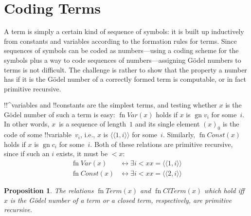 \documentclass[10pt,a4paper]{article}
\theoremstyle{plain}
\newtheorem{prop}[thm]{Proposition}
\theoremstyle{definition}
\theoremstyle{remark}
\newenvironment{explain}{}{}
\newcommand*{\olfileid}[3]{}
\newcommand*{\olsection}[1]{\section*{#1}}
\newcommand*{\ollabel}[1]{\label{#1}}
\providecommand{\Obj}{}
\providecommand{\tuple}[1]{\langle #1 \rangle}
\providecommand{\Gn}{\operatorname{gn}}
\providecommand{\bexists}{\exists}
\providecommand{\defiff}{\mathrel{\leftrightarrow}}
\providecommand{\fn}{\operatorname{fn}}
\begin{document}



\olfileid{inc}{art}{trm}
\olsection{Coding Terms}

\begin{explain}
A term is simply a certain kind of sequence of symbols: it is built up
inductively from constants and variables according to the formation
rules for terms.  Since sequences of symbols can be coded as
numbers---using a coding scheme for the symbols plus a way to code
sequences of numbers---assigning G\"odel numbers to terms is not
difficult.  The challenge is rather to show that the property a number
has if it is the G\"odel number of a correctly formed term is
computable, or in fact primitive recursive.
\end{explain}

!!^{variable}s and !!{constant}s are the simplest terms, and testing
whether $x$ is the G\"odel number of such a term is easy:
$\fn{Var}(x)$ holds if $x$ is $\Gn{\Obj v_i}$ for some~$i$. In other words,
$x$~is a sequence of length~$1$ and its single element $(x)_0$ is the
code of some !!{variable}~$\Obj v_i$, i.e., $x$ is $\tuple{\tuple{1, i}}$ for
some~$i$. Similarly, $\fn{Const}(x)$ holds if $x$ is $\Gn{\Obj c_i}$ for
some~$i$. Both of these relations are primitive recursive, since if
such an $i$ exists, it must be $< x$:
\begin{align*}
  \fn{Var}(x) & \defiff \bexists{i<x}{x = \tuple{\tuple{1, i}}}\\
  \fn{Const}(x) & \defiff \bexists{i<x}{x = \tuple{\tuple{2, i}}}
\end{align*}

\begin{prop}
\ollabel{prop:term-primrec}
The relations $\fn{Term}(x)$ and $\fn{ClTerm}(x)$ which hold iff $x$
is the G\"odel number of a term or a closed term, respectively, are
primitive recursive.
\end{prop}
\end{document}
